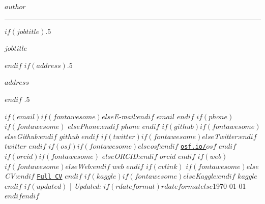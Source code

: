 
\usepackage{datetime}


\usepackage{orcidlink}




\centerline{\huge \bf $author$}

\vspace{2 mm}

\hrule

\vspace{2 mm}

$if(jobtitle)$\moveleft.5\hoffset\centerline{$jobtitle$}$endif$
$if(address)$\moveleft.5\hoffset\centerline{$address$}$endif$
\moveleft.5\hoffset\centerline{ $if(email)$$if(fontawesome)$\faEnvelope \hspace{1 mm}$else$\emph{E-mail:}$endif$ \href{mailto:}{\tt $email$} \hspace{1 mm}$endif$ $if(phone)$$if(fontawesome)$ \faPhone \hspace{1 mm}$else$\emph{Phone:}$endif$  $phone$  \hspace{1 mm} $endif$ $if(github)$$if(fontawesome)$\faGithub \hspace{1 mm}$else$\emph{Github:}$endif$ \href{http://github.com/$github$}{\tt $github$} \hspace{1 mm} $endif$  $if(twitter)$$if(fontawesome)$\faTwitter \hspace{1 mm}$else$\emph{Twitter:}$endif$ \href{https:/twitter.com/$twitter$}{\tt $twitter$} \hspace{1 mm} $endif$ $if(osf)$$if(fontawesome)$\faUnlock \hspace{1 mm}$else$\emph{osf:}$endif$ \href{https:/osf.io/$osf$}{\tt osf.io/$osf$} \hspace{1 mm} $endif$ $if(orcid)$$if(fontawesome)$ \hspace{.5 mm}$else$\emph{ORCID:}$endif$ \href{https://orcid.org/$orcid$}{\tt $orcid$} \hspace{1 mm} $endif$ $if(web)$$if(fontawesome)$\faGlobe \hspace{1 mm}$else$\emph{Web:}$endif$ \href{http://$web$}{\tt $web$}  $endif$ $if(cvlink)$\hspace{1 mm} $if(fontawesome)$\faFilePdf \hspace{1 mm}$else$\emph{CV:}$endif$ \href{$cvlink$}{\tt Full CV} \hspace{1 mm} $endif$ $if(kaggle)$$if(fontawesome)$\faKaggle \hspace{1 mm}$else$\emph{Kaggle:}$endif$ \href{http://kaggle.com/$kaggle$}{\tt $kaggle$} \hspace{1 mm} $endif$   $if(updated)$ | \emph{Updated:} $if(rdateformat)$$rdateformat$$else$\apstylekinda\today$endif$$endif$}



